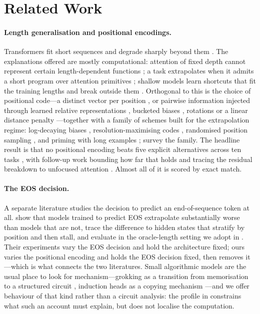 \section{Related Work}
\label{sec:related}

\paragraph{Length generalisation and positional encodings.} Transformers fit short
sequences and degrade sharply beyond them
\citep{anil2022exploring,deletang2023neural}. The explanations offered are mostly
computational: attention of fixed depth cannot represent certain length-dependent
functions \citep{hahn2020theoretical}; a task extrapolates when it admits a short
program over attention primitives \citep{weiss2021thinking,zhou2023what}; shallow
models learn shortcuts that fit the training lengths and break outside them
\citep{liu2023shortcuts}. Orthogonal to this is the choice of positional code---a
distinct vector per position \citep{vaswani2017attention}, or pairwise information
injected through learned relative representations \citep{shaw2018self}, bucketed
biases \citep{raffel2020exploring}, rotations \citep{su2024roformer} or a linear
distance penalty \citep{press2022train}---together with a family of schemes built for
the extrapolation regime: log-decaying biases \citep{chi2023dissecting},
resolution-maximising codes \citep{sun2023length}, randomised position sampling
\citep{ruoss2023randomized}, and priming with long examples
\citep{jelassi2023length}; \citet{zhao2024survey} survey the family. The headline
result is that no positional encoding beats five explicit alternatives across ten
tasks \citep{kazemnejad2023impact}, with follow-up work bounding how far that holds
and tracing the residual breakdown to unfocused attention \citep{wang2024length}.
Almost all of it is scored by exact match.

\paragraph{The EOS decision.} A separate literature studies the decision to predict an
end-of-sequence token at all. \citet{newman2020eos} show that models trained to predict
EOS extrapolate substantially worse than models that are not, trace the difference to
hidden states that stratify by position and then stall, and evaluate in the
oracle-length setting we adopt in . Their experiments vary the EOS
decision and hold the architecture fixed; ours varies the positional encoding and holds
the EOS decision fixed, then removes it---which is what connects the two literatures.
Small algorithmic models are the usual place to look for mechanism---grokking as a
transition from memorisation to a structured circuit
\citep{power2022grokking,nanda2023progress}, induction heads as a copying mechanism
\citep{olsson2022induction}---and we offer behaviour of that kind rather than a circuit
analysis: the profile in  constrains what such an account must
explain, but does not localise the computation.
